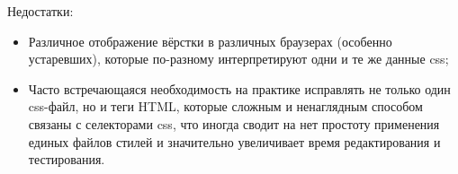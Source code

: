 Недостатки:
\begin{itemize}
	\item Различное отображение вёрстки в различных браузерах (особенно устаревших), которые по-разному интерпретируют одни и те же данные \gls{css};
	\item Часто встречающаяся необходимость на практике исправлять не только один \gls{css}-файл, но и теги HTML, которые сложным и ненаглядным способом связаны с селекторами \gls{css}, что иногда сводит на нет простоту применения единых файлов стилей и значительно увеличивает время редактирования и тестирования.
\end{itemize}